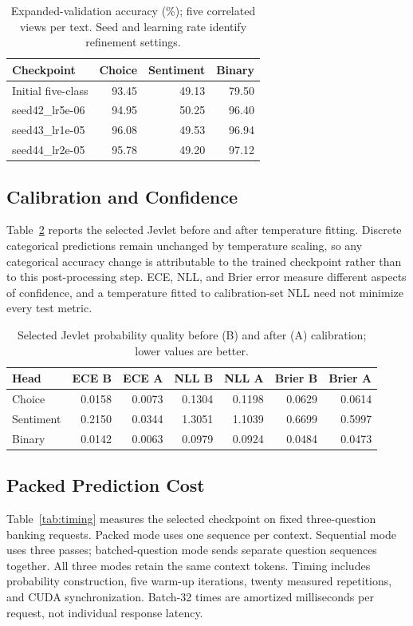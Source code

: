 \documentclass[conference]{IEEEtran}
\begin{document}
\begin{table}[t]
\caption{Expanded-validation accuracy (\%); five correlated views per text. Seed and learning rate identify refinement settings.}
\label{tab:validation}\centering\footnotesize\setlength{\tabcolsep}{3pt}
\begin{tabular}{lrrr}\toprule
Checkpoint & Choice & Sentiment & Binary\\\midrule
Initial five-class & 93.45 & 49.13 & 79.50 \\
seed42\_lr5e-06 & 94.95 & 50.25 & 96.40 \\
seed43\_lr1e-05 & 96.08 & 49.53 & 96.94 \\
seed44\_lr2e-05 & 95.78 & 49.20 & 97.12 \\
\bottomrule\end{tabular}\end{table}

\subsection{Calibration and Confidence}
Table~\ref{tab:calibration} reports the selected Jevlet before and after temperature fitting. Discrete categorical predictions remain unchanged by temperature scaling, so any categorical accuracy change is attributable to the trained checkpoint rather than to this post-processing step. ECE, NLL, and Brier error measure different aspects of confidence, and a temperature fitted to calibration-set NLL need not minimize every test metric.

\begin{table}[t]
\caption{Selected Jevlet probability quality before (B) and after (A) calibration; lower values are better.}
\label{tab:calibration}\centering\small
\begin{tabular}{lrrrrrr}\toprule
Head & ECE B & ECE A & NLL B & NLL A & Brier B & Brier A\\\midrule
Choice & 0.0158 & 0.0073 & 0.1304 & 0.1198 & 0.0629 & 0.0614 \\
Sentiment & 0.2150 & 0.0344 & 1.3051 & 1.1039 & 0.6699 & 0.5997 \\
Binary & 0.0142 & 0.0063 & 0.0979 & 0.0924 & 0.0484 & 0.0473 \\
\bottomrule\end{tabular}\end{table}

\subsection{Packed Prediction Cost}
Table~\ref{tab:timing} measures the selected checkpoint on fixed three-question banking requests. Packed mode uses one sequence per context. Sequential mode uses three passes; batched-question mode sends separate question sequences together. All three modes retain the same context tokens. Timing includes probability construction, five warm-up iterations, twenty measured repetitions, and CUDA synchronization. Batch-32 times are amortized milliseconds per request, not individual response latency.
\end{document}
